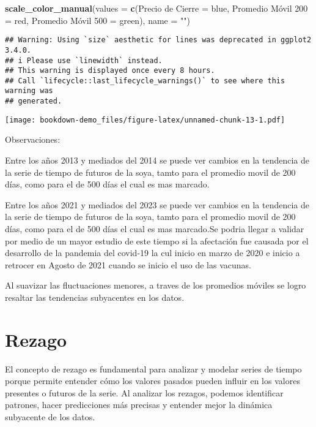 \documentclass[
]{book}
\newenvironment{Shaded}{\begin{snugshade}}{\end{snugshade}}
\newcommand{\AttributeTok}[1]{\textcolor[rgb]{0.13,0.29,0.53}{#1}}
\newcommand{\FunctionTok}[1]{\textcolor[rgb]{0.13,0.29,0.53}{\textbf{#1}}}
\newcommand{\NormalTok}[1]{#1}
\newcommand{\OtherTok}[1]{\textcolor[rgb]{0.56,0.35,0.01}{#1}}
\newcommand{\StringTok}[1]{\textcolor[rgb]{0.31,0.60,0.02}{#1}}
\begin{document}
\begin{Shaded}
\begin{Highlighting}[]
  \FunctionTok{scale\_color\_manual}\NormalTok{(}\AttributeTok{values =} \FunctionTok{c}\NormalTok{(}\StringTok{\textquotesingle{}Precio de Cierre\textquotesingle{}} \OtherTok{=} \StringTok{\textquotesingle{}blue\textquotesingle{}}\NormalTok{, }\StringTok{\textquotesingle{}Promedio Móvil 200\textquotesingle{}} \OtherTok{=} \StringTok{\textquotesingle{}red\textquotesingle{}}\NormalTok{, }\StringTok{\textquotesingle{}Promedio Móvil 500\textquotesingle{}} \OtherTok{=} \StringTok{\textquotesingle{}green\textquotesingle{}}\NormalTok{),}
                     \AttributeTok{name =} \StringTok{""}\NormalTok{)}
\end{Highlighting}
\end{Shaded}

\begin{verbatim}
## Warning: Using `size` aesthetic for lines was deprecated in ggplot2 3.4.0.
## i Please use `linewidth` instead.
## This warning is displayed once every 8 hours.
## Call `lifecycle::last_lifecycle_warnings()` to see where this warning was
## generated.
\end{verbatim}

\texttt{[image: bookdown-demo\_files/figure-latex/unnamed-chunk-13-1.pdf]}

Observaciones:

Entre los años 2013 y mediados del 2014 se puede ver cambios en la tendencia de la serie de tiempo de futuros de la soya, tamto para el promedio movil de 200 días, como para el de 500 días el cual es mas marcado.

Entre los años 2021 y mediados del 2023 se puede ver cambios en la tendencia de la serie de tiempo de futuros de la soya, tamto para el promedio movil de 200 días, como para el de 500 días el cual es mas marcado.Se podria llegar a validar por medio de un mayor estudio de este tiempo si la afectación fue causada por el desarrollo de la pandemia del covid-19 la cul inicio en marzo de 2020 e inicio a retrocer en Agosto de 2021 cuando se inicio el uso de las vacunas.

Al suavizar las fluctuaciones menores, a traves de los promedios móviles se logro resaltar las tendencias subyacentes en los datos.

\hypertarget{rezago}{%
\chapter{Rezago}\label{rezago}}

El concepto de rezago es fundamental para analizar y modelar series de tiempo porque permite entender cómo los valores pasados pueden influir en los valores presentes o futuros de la serie. Al analizar los rezagos, podemos identificar patrones, hacer predicciones más precisas y entender mejor la dinámica subyacente de los datos.
\end{document}
